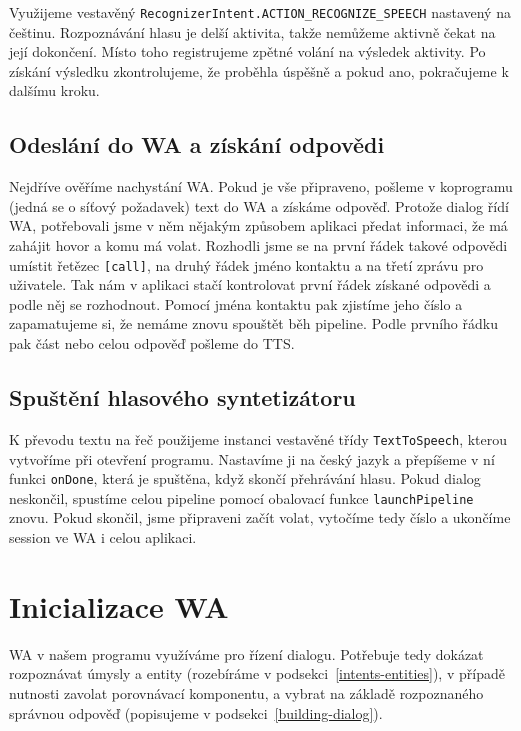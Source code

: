 Využijeme vestavěný \texttt{RecognizerIntent.ACTION\_RECOGNIZE\_SPEECH}
nastavený na češtinu. Rozpoznávání hlasu je delší aktivita, takže nemůžeme
aktivně čekat na její
dokončení. Místo toho registrujeme zpětné volání na výsledek aktivity.
Po získání výsledku zkontrolujeme, že proběhla úspěšně a pokud ano, pokračujeme
k dalšímu kroku.

\subsection{Odeslání do WA a získání odpovědi}
Nejdříve ověříme nachystání WA. Pokud je vše připraveno,
pošleme v koprogramu (jedná se o síťový požadavek) text do WA a získáme odpověď.
Protože dialog řídí WA, potřebovali jsme v něm nějakým způsobem aplikaci
předat informaci, že má zahájit hovor a komu má volat. Rozhodli jsme se na první
řádek takové odpovědi umístit řetězec \texttt{[call]}, na druhý řádek jméno kontaktu
a na třetí zprávu pro uživatele. Tak nám v aplikaci stačí kontrolovat první řádek získané
odpovědi a podle něj se rozhodnout. Pomocí jména kontaktu pak zjistíme jeho číslo
a zapamatujeme si, že nemáme znovu spouštět běh pipeline. Podle prvního řádku
pak část nebo celou odpověď pošleme do TTS.

\subsection{Spuštění hlasového syntetizátoru}

K převodu textu na řeč použijeme instanci vestavěné
třídy \texttt{TextToSpeech}, kterou vytvoříme při otevření programu. Nastavíme
ji na český jazyk a přepíšeme v ní funkci \texttt{onDone}, která je spuštěna,
když skončí přehrávání hlasu. Pokud dialog neskončil, spustíme celou pipeline
pomocí obalovací funkce \texttt{launchPipeline} znovu. Pokud
skončil, jsme připraveni začít volat, vytočíme tedy číslo a ukončíme session ve
WA i celou aplikaci.

\section{Inicializace WA}\label{wainit}

WA v našem programu využíváme pro řízení dialogu. Potřebuje tedy dokázat
rozpoznávat úmysly a entity (rozebíráme v podsekci~\ref{intents-entities}),
v případě nutnosti zavolat porovnávací komponentu, a vybrat na základě
rozpoznaného správnou odpověď (popisujeme v podsekci~\ref{building-dialog}).

